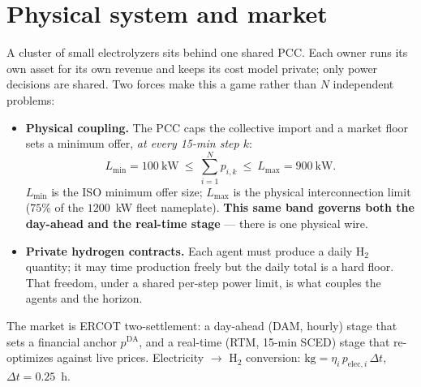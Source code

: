 \documentclass[11pt, letterpaper]{article}
\begin{document}
\section{Physical system and market}
A cluster of small electrolyzers sits behind one shared PCC. Each owner runs its own asset for its
own revenue and keeps its cost model private; only power decisions are shared. Two forces make this
a game rather than $N$ independent problems:
\begin{itemize}[nosep]
\item \textbf{Physical coupling.} The PCC caps the collective import and a market floor sets a
minimum offer, \emph{at every 15-min step $k$}:
\[
   L_{\min}=100\ \text{kW}\ \le\ \sum_{i=1}^{N} p_{i,k}\ \le\ L_{\max}=900\ \text{kW}.
\]
$L_{\min}$ is the ISO minimum offer size; $L_{\max}$ is the physical interconnection limit
($75\%$ of the $1200$~kW fleet nameplate). \textbf{This same band governs both the day-ahead and the
real-time stage} --- there is one physical wire.
\item \textbf{Private hydrogen contracts.} Each agent must produce a daily H$_2$ quantity; it may
time production freely but the daily total is a hard floor. That freedom, under a shared per-step
power limit, is what couples the agents and the horizon.
\end{itemize}
The market is ERCOT two-settlement: a day-ahead (DAM, hourly) stage that sets a financial anchor
$p^{\mathrm{DA}}$, and a real-time (RTM, 15-min SCED) stage that re-optimizes against live prices.
Electricity $\to$ H$_2$ conversion: $\text{kg}=\eta_i\,p_{\mathrm{elec},i}\,\Delta t$, $\Delta t=0.25$~h.
\end{document}
